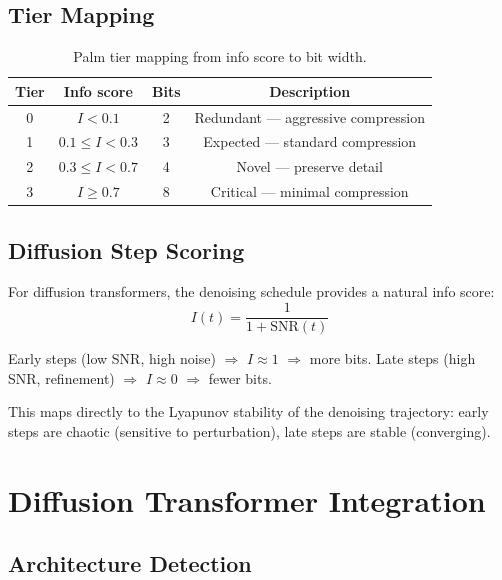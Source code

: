 \documentclass[11pt,a4paper]{article}
\begin{document}
\subsection{Tier Mapping}

\begin{table}[h]
\centering
\caption{Palm tier mapping from info score to bit width.}
\label{tab:palm-tiers}
\begin{tabular}{cccc}
\toprule
\textbf{Tier} & \textbf{Info score} & \textbf{Bits} & \textbf{Description} \\
\midrule
0 & $I < 0.1$           & 2 & Redundant --- aggressive compression \\
1 & $0.1 \leq I < 0.3$  & 3 & Expected --- standard compression \\
2 & $0.3 \leq I < 0.7$  & 4 & Novel --- preserve detail \\
3 & $I \geq 0.7$         & 8 & Critical --- minimal compression \\
\bottomrule
\end{tabular}
\end{table}

\subsection{Diffusion Step Scoring}

For diffusion transformers, the denoising schedule provides a natural info score:
\begin{equation}\label{eq:diffusion-score}
  I(t) = \frac{1}{1 + \text{SNR}(t)}
\end{equation}

Early steps (low SNR, high noise) $\Rightarrow$ $I \approx 1$ $\Rightarrow$ more bits.
Late steps (high SNR, refinement) $\Rightarrow$ $I \approx 0$ $\Rightarrow$ fewer bits.

This maps directly to the Lyapunov stability of the denoising trajectory: early steps are chaotic (sensitive to perturbation), late steps are stable (converging).

\section{Diffusion Transformer Integration}

\subsection{Architecture Detection}
\end{document}
